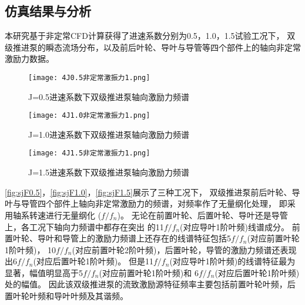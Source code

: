 \subsection{仿真结果与分析}
本研究基于非定常CFD计算获得了进速系数分别为0.5，1.0，1.5试验工况下，
双级推进泵的瞬态流场分布，以及前后叶轮、导叶与导管等四个部件上的轴向非定常激励力数据。
\begin{figure}[htbp]
    \centering
    \texttt{[image: 4J0.5非定常激振力1.png]}
    \caption{\label{fig:sjF0.5}J=0.5进速系数下双级推进泵轴向激励力频谱}
\end{figure}
\begin{figure}[htbp]
    \centering
    \texttt{[image: 4J1.0非定常激振力1.png]}
    \caption{\label{fig:sjF1.0}J=1.0进速系数下双级推进泵轴向激励力频谱}
\end{figure}
\begin{figure}[htbp]
    \centering
    \texttt{[image: 4J1.5非定常激振力1.png]}
    \caption{\label{fig:sjF1.5}J=1.5进速系数下双级推进泵轴向激励力频谱}
\end{figure}

\autoref{fig:sjF0.5}，\autoref{fig:sjF1.0}，\autoref{fig:sjF1.5}展示了三种工况下，
双级推进泵前后叶轮、导叶与导管四个部件上轴向非定常激励力的频谱，对频率作了无量纲化处理，
即采用轴系转速进行无量纲化 ($f/f_n$)。
无论在前置叶轮、后置叶轮、导叶还是导管上，各工况下轴向力频谱中都存在突出
的11$f/f_n$(对应导叶1阶叶频)线谱成分。
前置叶轮、导叶和导管上的激励力频谱上还存在的线谱特征包括5$f/f_n$(对应前置叶轮1阶叶频)，
10$f/f_n$(对应前置叶轮2阶叶频)，后置叶轮，导管的激励力频谱还表现出6$f/f_n$(对应后置叶轮1阶叶频)。
但是11$f/f_n$(对应导叶1阶叶频)的线谱特征最为显著，幅值明显高于5$f/f_n$(对应前置叶轮1阶叶频)和
6$f/f_n$(对应后置叶轮1阶叶频)处的幅值。
因此该双级推进泵的流致激励源特征频率主要包括前置叶轮叶频，后置叶轮叶频和导叶叶频及其谐频。

